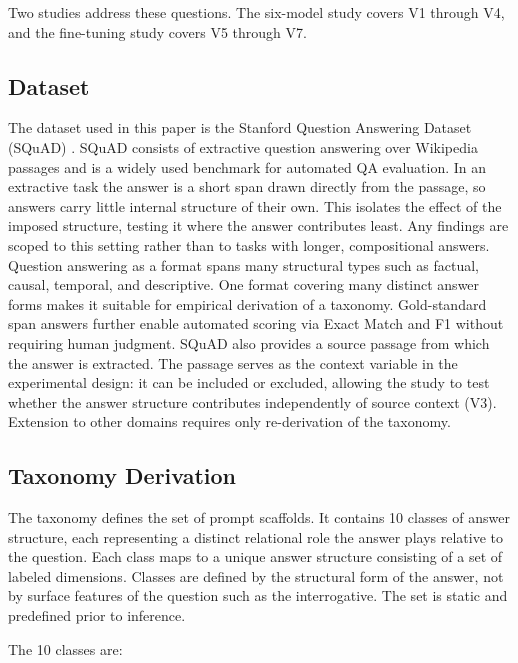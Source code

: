 \documentclass{article}
\begin{document}
Two studies address these questions. The six-model study covers V1 through V4, and the fine-tuning study covers V5 through V7.

\subsection{Dataset}

The dataset used in this paper is the Stanford Question Answering Dataset (SQuAD) \cite{rajpurkar2016squad}. SQuAD consists of extractive question answering over Wikipedia passages and is a widely used benchmark for automated QA evaluation. In an extractive task the answer is a short span drawn directly from the passage, so answers carry little internal structure of their own. This isolates the effect of the imposed structure, testing it where the answer contributes least. Any findings are scoped to this setting rather than to tasks with longer, compositional answers. Question answering as a format spans many structural types such as factual, causal, temporal, and descriptive. One format covering many distinct answer forms makes it suitable for empirical derivation of a taxonomy. Gold-standard span answers further enable automated scoring via Exact Match and F1 without requiring human judgment. SQuAD also provides a source passage from which the answer is extracted. The passage serves as the context variable in the experimental design: it can be included or excluded, allowing the study to test whether the answer structure contributes independently of source context (V3). Extension to other domains requires only re-derivation of the taxonomy.

\subsection{Taxonomy Derivation}

The taxonomy defines the set of prompt scaffolds. It contains 10 classes of answer structure, each representing a distinct relational role the answer plays relative to the question. Each class maps to a unique answer structure consisting of a set of labeled dimensions. Classes are defined by the structural form of the answer, not by surface features of the question such as the interrogative. The set is static and predefined prior to inference.

The 10 classes are:
\end{document}
